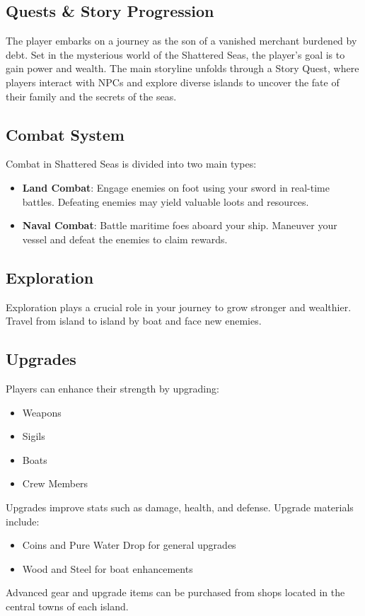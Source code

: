 \documentclass{article}
\begin{document}
\subsection{Quests \& Story Progression}
The player embarks on a journey as the son of a vanished merchant burdened by debt. Set in the mysterious world of the Shattered Seas, the player’s goal is to gain power and wealth. The main storyline unfolds through a Story Quest, where players interact with NPCs and explore diverse islands to uncover the fate of their family and the secrets of the seas.

\subsection{Combat System}
Combat in Shattered Seas is divided into two main types:
\begin{itemize}
    \item \textbf{Land Combat}: Engage enemies on foot using your sword in real-time battles. Defeating enemies may yield valuable loots and resources.
    \item \textbf{Naval Combat}: Battle maritime foes aboard your ship. Maneuver your vessel and defeat the enemies to claim rewards.
\end{itemize}

\subsection{Exploration}
Exploration plays a crucial role in your journey to grow stronger and wealthier. Travel from island to island by boat and face new enemies.

\subsection{Upgrades}
Players can enhance their strength by upgrading:
\begin{itemize}
    \item Weapons
    \item Sigils
    \item Boats
    \item Crew Members
\end{itemize}
Upgrades improve stats such as damage, health, and defense.
Upgrade materials include:
\begin{itemize}
    \item Coins and Pure Water Drop for general upgrades
    \item Wood and Steel for boat enhancements
\end{itemize}
Advanced gear and upgrade items can be purchased from shops located in the central towns of each island.
\end{document}

